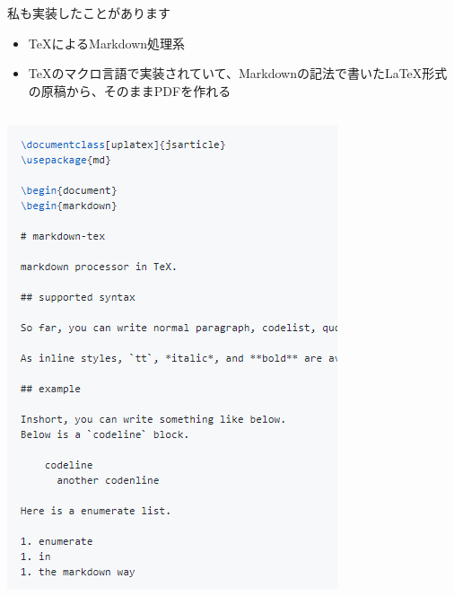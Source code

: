 \documentclass[14pt,dvipdfmx,uplatex]{beamer}
\begin{document}
\begin{frame}[t]{\inhibitglue 私も実装したことがあります}
  \sffamily
  \begin{itemize}
    \item \TeX によるMarkdown処理系
    \item \TeX{}のマクロ言語で実装されていて、Markdownの記法で書いた\LaTeX{}形式の原稿から、そのままPDFを作れる
  \end{itemize}
  \begin{center}
    \begin{columns}[c]
      \begin{column}{.4\textwidth}
      \includegraphics[width=\textwidth]{figures/mdtex-input.png}
      \end{column}
      \begin{column}{.4\textwidth}

\end{column}
\end{columns}
\end{center}
\end{frame}
\end{document}
